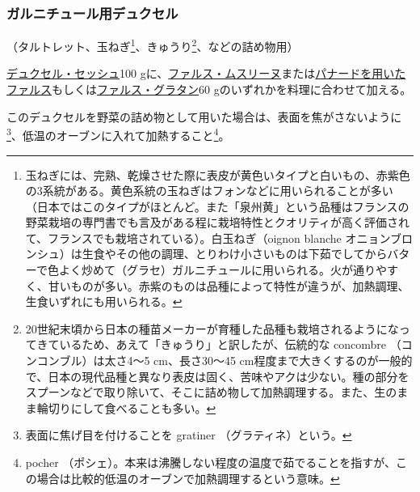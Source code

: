 \begin{recette}
\atoaki{}

\hypertarget{duxelles-pour-farnitures-diverses}{%
\subsubsection{ガルニチュール用デュクセル}\label{duxelles-pour-farnitures-diverses}}



（タルトレット、玉ねぎ\footnote{玉ねぎには、完熟、乾燥させた際に表皮が黄色いタイプと白いもの、赤紫色の3系統がある。黄色系統の玉ねぎはフォンなどに用いられることが多い（日本ではこのタイプがほとんど。また「泉州黄」という品種はフランスの野菜栽培の専門書でも言及がある程に栽培特性とクオリティが高く評価されて、フランスでも栽培されている）。白玉ねぎ（oignon
  blanche
  オニョンブロンシュ）は生食やその他の調理、とりわけ小さいものは下茹でしてからバターで色よく炒めて（グラセ）ガルニチュールに用いられる。火が通りやすく、甘いものが多い。赤紫のものは品種によって特性が違うが、加熱調理、生食いずれにも用いられる。}、きゅうり\footnote{20世紀末頃から日本の種苗メーカーが育種した品種も栽培されるようになってきているため、あえて「きゅうり」と訳したが、伝統的な
  concombre （コンコンブル）は太さ4〜5 cm、長さ30〜45
  cm程度まで大きくするのが一般的で、日本の現代品種と異なり表皮は固く、苦味やアクは少ない。種の部分をスプーンなどで取り除いて、そこに詰め物して加熱調理する。また、生のまま輪切りにして食べることも多い。}、などの詰め物用）

\protect\hyperlink{duxelles-seche}{デュクセル・セッシュ}100
gに、\protect\hyperlink{farce-c}{ファルス・ムスリーヌ}または\protect\hyperlink{farce-a}{パナードを用いたファルス}もしくは\protect\hyperlink{farce-gratin-a}{ファルス・グラタン}60
gのいずれかを料理に合わせて加える。

このデュクセルを野菜の詰め物として用いた場合は、表面を焦がさないように\footnote{表面に焦げ目を付けることを
  gratiner （グラティネ）という。}、低温のオーブンに入れて加熱すること\footnote{pocher
  （ポシェ）。本来は沸騰しない程度の温度で茹でることを指すが、この場合は比較的低温のオーブンで加熱調理するという意味。}。

\atoaki{}


\end{recette}
